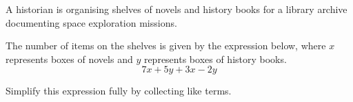 \begin{question}
\noindent A historian is organising shelves of novels and history books for a library archive documenting space exploration missions.

The number of items on the shelves is given by the expression below, where $x$ represents boxes of novels and $y$ represents boxes of history books.
\[
7x + 5y + 3x - 2y
\]

Simplify this expression fully by collecting like terms.
\vspace{4cm}
\end{question}